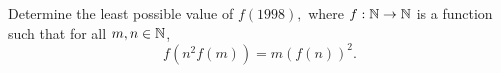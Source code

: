 Determine the least possible value of $f(1998),$ where $f:\Bbb{N}\to \Bbb{N}$ is a function such that for all $m,n\in {\Bbb N}$, \[f\left( n^{2}f(m)\right) =m\left( f(n)\right) ^{2}. \]